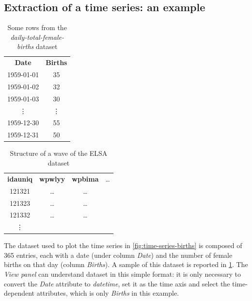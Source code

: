 \subsection{Extraction of a time series: an example}\label{ssec:ts-extract}
\begin{table}[!ht]
	\centering
	{\renewcommand{\arraystretch}{1.2}
		\begin{tabular}{cc}
			\rowcolor{tableHead}
			\color{white}\textbf{Date} & \color{white}\textbf{Births} \\
			1959-01-01 & 35 \\
			1959-01-02 & 32 \\
			1959-01-03 & 30 \\
			\vdots & \vdots \\
			1959-12-30 & 55\\
			1959-12-31 & 50
		\end{tabular}
	}
	\caption{Some rows from the \textit{daily-total-female-births} dataset}
	\label{tab:female-births-str}
\end{table}
\begin{table}[!ht]
	\centering
	{\renewcommand{\arraystretch}{1.2}
		\begin{tabular}{cccc}
			\rowcolor{tableHead}
			\color{white}\textbf{idauniq} & \color{white}\textbf{wpwlyy} & \color{white}\textbf{wpbima} & \color{white}\ldots \\
			121321 & \ldots & \ldots &\\
			121323 & \ldots & \ldots &\\
			121332 & \ldots & \ldots &\\
			\vdots & & &
		\end{tabular}
	}
	\caption{Structure of a wave of the ELSA dataset}
	\label{tab:elsa-wave-str}
\end{table}
The dataset used to plot the time series in \cref{fig:time-series-births} is composed of 365 entries, each with a date (under column \textit{Date}) and the number of female births on that day (column \textit{Births}). A sample of this dataset is reported in \cref{tab:female-births-str}.
The \textit{View panel} can understand dataset in this simple format: it is only necessary to convert the \textit{Date} attribute to \textit{datetime}, set it as the time axis and select the time-dependent attributes, which is only \textit{Births} in this example.\\
